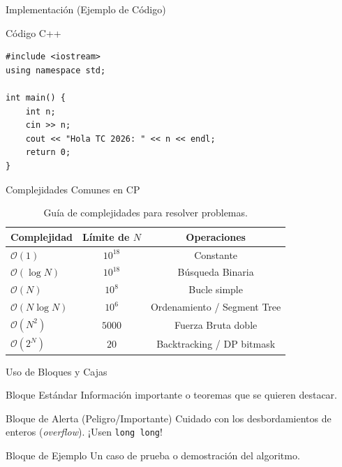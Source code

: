 \documentclass{beamer}
\begin{document}
\begin{frame}[fragile]{Implementación (Ejemplo de Código)}
    \begin{block}{Código C++}
    \begin{verbatim}
#include <iostream>
using namespace std;

int main() {
    int n;
    cin >> n;
    cout << "Hola TC 2026: " << n << endl;
    return 0;
}
    \end{verbatim}
    \end{block}
\end{frame}


\begin{frame}{Complejidades Comunes en CP}
    \begin{table}
        \centering
        \begin{tabular}{|l|c|c|}
            \hline
            \textbf{Complejidad} & \textbf{Límite de $N$} & \textbf{Operaciones} \\
            \hline
            $\mathcal{O}(1)$ & $10^{18}$ & Constante \\
            $\mathcal{O}(\log N)$ & $10^{18}$ & Búsqueda Binaria \\
            $\mathcal{O}(N)$ & $10^8$ & Bucle simple \\
            $\mathcal{O}(N \log N)$ & $10^6$ & Ordenamiento / Segment Tree \\
            $\mathcal{O}(N^2)$ & $5000$ & Fuerza Bruta doble \\
            $\mathcal{O}(2^N)$ & $20$ & Backtracking / DP bitmask \\
            \hline
        \end{tabular}
        \caption{Guía de complejidades para resolver problemas.}
    \end{table}
\end{frame}


\begin{frame}{Uso de Bloques y Cajas}
    \begin{block}{Bloque Estándar}
        Información importante o teoremas que se quieren destacar.
    \end{block}
    
    \begin{alertblock}{Bloque de Alerta (Peligro/Importante)}
        Cuidado con los desbordamientos de enteros (\textit{overflow}). ¡Usen \texttt{long long}!
    \end{alertblock}
    
    \begin{exampleblock}{Bloque de Ejemplo}
        Un caso de prueba o demostración del algoritmo.
    \end{exampleblock}
\end{frame}
\end{document}

